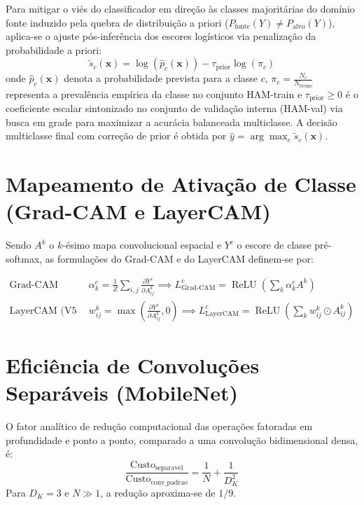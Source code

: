 \documentclass[oneside,english,brazilian]{UNISINOSmonografia}
\begin{document}
Para mitigar o viés do classificador em direção às classes majoritárias do domínio fonte induzido pela quebra de distribuição a priori ($P_{\text{fonte}}(Y) \neq P_{\text{alvo}}(Y)$), aplica-se o ajuste pós-inferência dos escores logísticos via penalização da probabilidade a priori:
\begin{equation}
    \label{eq:apendice_prior_correction}
    \tilde{s}_c(\mathbf{x}) = \log\left(\hat{p}_c(\mathbf{x})\right) - \tau_{\text{prior}} \log(\pi_c)
\end{equation}
onde $\hat{p}_c(\mathbf{x})$ denota a probabilidade prevista para a classe $c$, $\pi_c = \frac{N_c}{N_{\text{treino}}}$ representa a prevalência empírica da classe no conjunto HAM-train e $\tau_{\text{prior}} \ge 0$ é o coeficiente escalar sintonizado no conjunto de validação interna (HAM-val) via busca em grade para maximizar a acurácia balanceada multiclasse. A decisão multiclasse final com correção de prior é obtida por $\hat{y} = \arg\max_{c} \tilde{s}_c(\mathbf{x})$.

\section{Mapeamento de Ativação de Classe (Grad-CAM e LayerCAM)}
\label{sec:apendice_interpretabilidade}

Sendo $A^k$ o $k$-ésimo mapa convolucional espacial e $Y^c$ o escore de classe pré-softmax, as formulações do Grad-CAM \cite{selvaraju2017gradcam} e do LayerCAM \cite{jiang2021layercam} definem-se por:

\begin{align}
    \text{Grad-CAM (V1--V4):} \quad & \alpha_k^c = \frac{1}{Z} \sum_{i,j} \frac{\partial Y^c}{\partial A_{ij}^k} \implies L_{\text{Grad-CAM}}^c = \operatorname{ReLU}\left( \sum_{k} \alpha_k^c A^k \right) \label{eq:apendice_gradcam} \\
    \text{LayerCAM (V5 MSFA):} \quad & w_{ij}^k = \max\left( \frac{\partial Y^c}{\partial A_{ij}^k}, 0 \right) \implies L_{\text{LayerCAM}}^c = \operatorname{ReLU}\left( \sum_{k} w_{ij}^k \odot A_{ij}^k \right) \label{eq:apendice_layercam}
\end{align}

\section{Eficiência de Convoluções Separáveis (MobileNet)}
\label{sec:apendice_convolucoes}

O fator analítico de redução computacional das operações fatoradas em profundidade e ponto a ponto, comparado a uma convolução bidimensional densa, é:
\begin{equation}
    \label{eq:apendice_fator_reducao_mobilenet}
    \frac{\text{Custo}_{\text{separavel}}}{\text{Custo}_{\text{conv\_padrao}}} = \frac{1}{N} + \frac{1}{D_K^2}
\end{equation}
Para $D_K = 3$ e $N \gg 1$, a redução aproxima-se de $1/9$.
\end{document}
